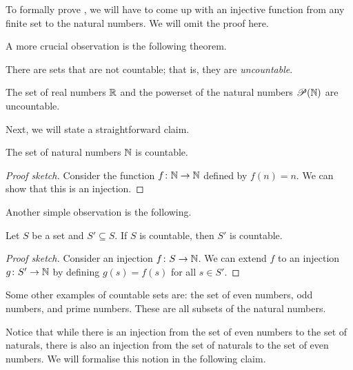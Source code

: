 \documentclass[11pt,usenames, dvipsnames]{article}
\begin{document}
To formally prove , we will have to come up with an injective function from any finite set to the natural numbers. We will omit the proof here.

A more crucial observation is the following theorem.

\begin{theorem}
  There are sets that are not countable; that is, they are \emph{uncountable}.
\end{theorem}

\begin{example}
  The set of real numbers $\mathbb{R}$ and the powerset of the natural numbers $\mathscr{P}(\mathbb{N})$ are uncountable.
\end{example}

Next, we will state a straightforward claim.

\begin{claim}
  The set of natural numbers $\mathbb{N}$ is countable.
\end{claim}

\begin{proof}[Proof sketch]
  Consider the function $f \colon \mathbb{N} \to \mathbb{N}$ defined by $f(n) = n$. We can show that this is an injection.
\end{proof}

Another simple observation is the following.

\begin{claim}
  Let $S$ be a set and $S' \subseteq S$. If $S$ is countable, then $S'$ is countable.
\end{claim}

\begin{proof}[Proof sketch]
  Consider an injection $f \colon S \to \mathbb{N}$. We can extend $f$ to an injection $g \colon S' \to \mathbb{N}$ by defining $g(s) = f(s)$ for all $s \in S'$.
\end{proof}

\begin{example}
  Some other examples of countable sets are: the set of even numbers, odd numbers, and prime numbers. These are all subsets of the natural numbers.
\end{example}

Notice that while there is an injection from the set of even numbers to the set of naturals, there is also an injection from the set of naturals to the set of even numbers. We will formalise this notion in the following claim.
\end{document}
